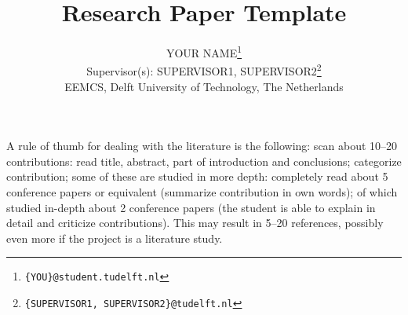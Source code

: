 \documentclass[english]{article}
\begin{document}
\title{Research Paper Template}

\author{YOUR NAME\footnote{\texttt{\{YOU\}@student.tudelft.nl}}\\
Supervisor(s): SUPERVISOR1, SUPERVISOR2\footnote{\texttt{\{SUPERVISOR1, SUPERVISOR2\}@tudelft.nl}}\\
EEMCS, Delft University of Technology, The Netherlands
}


\maketitle























A rule of thumb for dealing with the literature is the following: scan about 10--20 contributions: read title, abstract, part of introduction and conclusions; categorize contribution; some of these are studied in more depth: completely read about 5 conference papers or equivalent (summarize contribution in own words); of which studied in-depth about 2 conference papers (the student is able to explain in detail and criticize contributions). This may result in 5--20 references, possibly even more if the project is a literature study.
\end{document}
